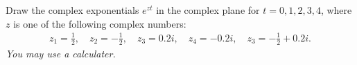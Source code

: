 \documentclass[11pt]{article}
\begin{document}








\begin{exercise}
    Draw the complex exponentials $e^{zt}$ in the complex plane for $t=0,1,2,3,4$, 
    where $z$ is one of the following complex numbers:
    \begin{gather*}
        z_1 = \frac 1 2,
        \quad 
        z_2 = - \frac 1 2,
        \quad 
        z_3 = 0.2i,
        \quad 
        z_4 = -0.2i,
        \quad 
        z_3 = - \frac 1 2 + 0.2i
        .
    \end{gather*}
    \textit{You may use a calculater.}
\end{exercise}

\begin{solution}     
\end{solution}
\end{document}

